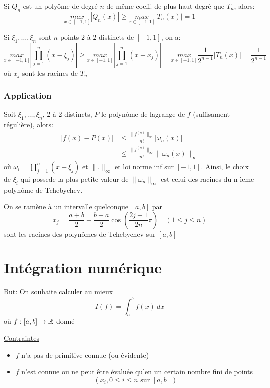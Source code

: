 \documentclass[a4paper]{report}
\begin{document}
\begin{prop}
   Si $Q_n$ est un polyôme de degré  $n$ de même coeff. de plus haut degré que  $T_n$, alors:
   \[
       \underset{x \in [-1, 1]}{max} |Q_n(x)| \ge \underset{x \in [-1, 1]}{max} |T_n(x)| = 1
   \] 
\end{prop}

\begin{corollary}
    Si $\xi_1, \ldots, \xi_n$  sont $n$ points  $2$ à  $2$ distincts de  $[-1, 1]$, on a:
     \[
         \underset{x \in [-1, 1]}{max} \left| \prod_{j=1}^{n} (x - \xi_{j})  \right| \ge \underset{x \in [-1, 1]}{max} \left| \prod_{j=1}^{n} (x - x_j)  \right| = \underset{x \in [-1, 1]}{max} \frac{1}{2^{n-1}} |T_n(x)| = \frac{1}{2^{n-1}}
    \] 
    où $x_j$ sont les racines de  $T_n$
\end{corollary}

\subsection{Application}
Soit $\xi_1, \ldots, \xi_n$, 2 à 2 distincts, $P$ le polynôme de lagrange de  $f$ (suffisament régulière), alors:
 \begin{align*}
     |f(x) - P(x)| &\le \frac{\|f^{(n)}\|_{\infty}}{n!}|\omega_n(x)|\\
                   &\le \frac{\|f^{(n)}\|_{\infty}}{n!}\|\omega_n(x)\|_{\infty}
\end{align*}
où $\omega_i = \prod_{j=1}^{n} (x - \xi_j) $ et $\| . \|_{\infty}$ et loi norme inf sur $[-1, 1]$. Ainsi, le choix de $\xi_i$ qui possede la plus petite valeur de  $\| \omega_n\|_{\infty}$ est celui des racines du n-ìeme polynôme de Tchebychev.

\begin{remark}
    On se ramène à un intervalle quelconque $[a, b]$ par 
    \[
    x_j = \frac{a + b}{2} + \frac{b - a}{2}\cos(\frac{2j - 1}{2n}\pi) \quad (1 \le j \le n)
    \] 
    sont les racines des polynômes de Tchebychev sur $[a, b]$
\end{remark}


\chapter{Intégration numérique}
\underline{But:} On souhaite calculer au mieux
\[
I(f) = \int_{{a}}^{{b}} {f(x)} \: d{x} {} 
\] 
où $f: [a, b] \to \mathbb{R}$ donné
\par
\underline{Contraintes}
\begin{itemize}
    \item $f$ n'a pas de primitive connue (ou évidente)
    \item  $f$ n'est connue ou ne peut être évaluée qu'en un certain nombre fini de points 
         \[
             (x_i, 0\le i \le n \text{ sur } [a, b])
        \] 
\end{itemize}
\end{document}

